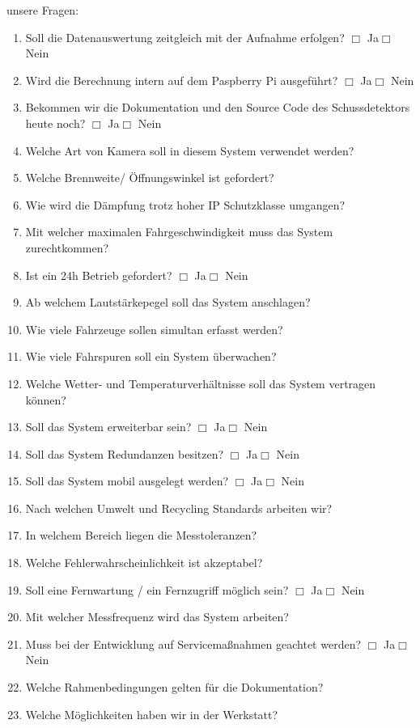 \vspace{2cm}
\noindent
unsere Fragen:
\begin{enumerate}
\item Soll die Datenauswertung zeitgleich mit der Aufnahme erfolgen? \hfill $\Box$ Ja\qquad $\Box$ Nein
\item Wird die Berechnung intern auf dem Paspberry Pi ausgeführt? \hfill $\Box$ Ja\qquad $\Box$ Nein
\item Bekommen wir die Dokumentation und den Source Code des Schussdetektors heute noch? \hfill $\Box$ Ja\qquad $\Box$ Nein
\item Welche Art von Kamera soll in diesem System verwendet werden?
\item Welche Brennweite/ Öffnungswinkel ist gefordert?
\item Wie wird die Dämpfung trotz hoher IP Schutzklasse umgangen?
\item Mit welcher maximalen Fahrgeschwindigkeit muss das System zurechtkommen?
\item Ist ein 24h Betrieb gefordert? \hfill $\Box$ Ja\qquad $\Box$ Nein
\item Ab welchem Lautstärkepegel soll das System anschlagen?
\item Wie viele Fahrzeuge sollen simultan erfasst werden?
\item Wie viele Fahrspuren soll ein System überwachen?
\item Welche Wetter- und Temperaturverhältnisse soll das System vertragen können?
\item Soll das System erweiterbar sein? \hfill $\Box$ Ja\qquad $\Box$ Nein
\item Soll das System Redundanzen besitzen? \hfill $\Box$ Ja\qquad $\Box$ Nein
\item Soll das System mobil ausgelegt werden? \hfill $\Box$ Ja\qquad $\Box$ Nein
\item Nach welchen Umwelt und Recycling Standards arbeiten wir?
\item In welchem Bereich liegen die Messtoleranzen?
\item Welche Fehlerwahrscheinlichkeit ist akzeptabel?
\item Soll eine Fernwartung / ein Fernzugriff möglich sein? \hfill $\Box$ Ja\qquad $\Box$ Nein
\item Mit welcher Messfrequenz wird das System arbeiten?
\item Muss bei der Entwicklung auf Servicemaßnahmen geachtet werden? \hfill $\Box$ Ja\qquad $\Box$ Nein
\item Welche Rahmenbedingungen gelten für die Dokumentation?
\item Welche Möglichkeiten haben wir in der Werkstatt?
\end{enumerate}
\newpage